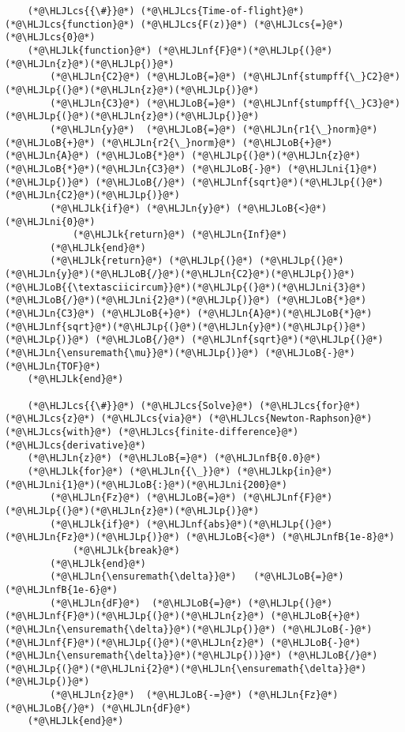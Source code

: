 \documentclass[12pt,a4paper]{article}
\newcommand{\HLJLk}[1]{\textcolor[RGB]{148,91,176}{\textbf{#1}}}
\newcommand{\HLJLkp}[1]{\textcolor[RGB]{148,91,176}{\textbf{#1}}}
\newcommand{\HLJLn}[1]{#1}
\newcommand{\HLJLnf}[1]{\textcolor[RGB]{66,102,213}{#1}}
\newcommand{\HLJLnfB}[1]{\textcolor[RGB]{59,151,46}{#1}}
\newcommand{\HLJLni}[1]{\textcolor[RGB]{59,151,46}{#1}}
\newcommand{\HLJLoB}[1]{\textcolor[RGB]{102,102,102}{\textbf{#1}}}
\newcommand{\HLJLp}[1]{#1}
\newcommand{\HLJLcs}[1]{\textcolor[RGB]{153,153,119}{\textit{#1}}}
\begin{document}
\begin{lstlisting}
	(*@\HLJLcs{{\#}}@*) (*@\HLJLcs{Time‐of‐flight}@*) (*@\HLJLcs{function}@*) (*@\HLJLcs{F(z)}@*) (*@\HLJLcs{=}@*) (*@\HLJLcs{0}@*)
	(*@\HLJLk{function}@*) (*@\HLJLnf{F}@*)(*@\HLJLp{(}@*)(*@\HLJLn{z}@*)(*@\HLJLp{)}@*)
		(*@\HLJLn{C2}@*) (*@\HLJLoB{=}@*) (*@\HLJLnf{stumpff{\_}C2}@*)(*@\HLJLp{(}@*)(*@\HLJLn{z}@*)(*@\HLJLp{)}@*)
		(*@\HLJLn{C3}@*) (*@\HLJLoB{=}@*) (*@\HLJLnf{stumpff{\_}C3}@*)(*@\HLJLp{(}@*)(*@\HLJLn{z}@*)(*@\HLJLp{)}@*)
		(*@\HLJLn{y}@*)  (*@\HLJLoB{=}@*) (*@\HLJLn{r1{\_}norm}@*) (*@\HLJLoB{+}@*) (*@\HLJLn{r2{\_}norm}@*) (*@\HLJLoB{+}@*) (*@\HLJLn{A}@*) (*@\HLJLoB{*}@*) (*@\HLJLp{(}@*)(*@\HLJLn{z}@*)(*@\HLJLoB{*}@*)(*@\HLJLn{C3}@*) (*@\HLJLoB{-}@*) (*@\HLJLni{1}@*)(*@\HLJLp{)}@*) (*@\HLJLoB{/}@*) (*@\HLJLnf{sqrt}@*)(*@\HLJLp{(}@*)(*@\HLJLn{C2}@*)(*@\HLJLp{)}@*)
		(*@\HLJLk{if}@*) (*@\HLJLn{y}@*) (*@\HLJLoB{<}@*) (*@\HLJLni{0}@*)
			(*@\HLJLk{return}@*) (*@\HLJLn{Inf}@*)
		(*@\HLJLk{end}@*)
		(*@\HLJLk{return}@*) (*@\HLJLp{(}@*) (*@\HLJLp{(}@*)(*@\HLJLn{y}@*)(*@\HLJLoB{/}@*)(*@\HLJLn{C2}@*)(*@\HLJLp{)}@*)(*@\HLJLoB{{\textasciicircum}}@*)(*@\HLJLp{(}@*)(*@\HLJLni{3}@*)(*@\HLJLoB{/}@*)(*@\HLJLni{2}@*)(*@\HLJLp{)}@*) (*@\HLJLoB{*}@*) (*@\HLJLn{C3}@*) (*@\HLJLoB{+}@*) (*@\HLJLn{A}@*)(*@\HLJLoB{*}@*)(*@\HLJLnf{sqrt}@*)(*@\HLJLp{(}@*)(*@\HLJLn{y}@*)(*@\HLJLp{)}@*) (*@\HLJLp{)}@*) (*@\HLJLoB{/}@*) (*@\HLJLnf{sqrt}@*)(*@\HLJLp{(}@*)(*@\HLJLn{\ensuremath{\mu}}@*)(*@\HLJLp{)}@*) (*@\HLJLoB{-}@*) (*@\HLJLn{TOF}@*)
	(*@\HLJLk{end}@*)

	(*@\HLJLcs{{\#}}@*) (*@\HLJLcs{Solve}@*) (*@\HLJLcs{for}@*) (*@\HLJLcs{z}@*) (*@\HLJLcs{via}@*) (*@\HLJLcs{Newton‐Raphson}@*) (*@\HLJLcs{with}@*) (*@\HLJLcs{finite‐difference}@*) (*@\HLJLcs{derivative}@*)
	(*@\HLJLn{z}@*) (*@\HLJLoB{=}@*) (*@\HLJLnfB{0.0}@*)
	(*@\HLJLk{for}@*) (*@\HLJLn{{\_}}@*) (*@\HLJLkp{in}@*) (*@\HLJLni{1}@*)(*@\HLJLoB{:}@*)(*@\HLJLni{200}@*)
		(*@\HLJLn{Fz}@*) (*@\HLJLoB{=}@*) (*@\HLJLnf{F}@*)(*@\HLJLp{(}@*)(*@\HLJLn{z}@*)(*@\HLJLp{)}@*)
		(*@\HLJLk{if}@*) (*@\HLJLnf{abs}@*)(*@\HLJLp{(}@*)(*@\HLJLn{Fz}@*)(*@\HLJLp{)}@*) (*@\HLJLoB{<}@*) (*@\HLJLnfB{1e-8}@*)
			(*@\HLJLk{break}@*)
		(*@\HLJLk{end}@*)
		(*@\HLJLn{\ensuremath{\delta}}@*)   (*@\HLJLoB{=}@*) (*@\HLJLnfB{1e-6}@*)
		(*@\HLJLn{dF}@*)  (*@\HLJLoB{=}@*) (*@\HLJLp{(}@*)(*@\HLJLnf{F}@*)(*@\HLJLp{(}@*)(*@\HLJLn{z}@*) (*@\HLJLoB{+}@*) (*@\HLJLn{\ensuremath{\delta}}@*)(*@\HLJLp{)}@*) (*@\HLJLoB{-}@*) (*@\HLJLnf{F}@*)(*@\HLJLp{(}@*)(*@\HLJLn{z}@*) (*@\HLJLoB{-}@*) (*@\HLJLn{\ensuremath{\delta}}@*)(*@\HLJLp{))}@*) (*@\HLJLoB{/}@*) (*@\HLJLp{(}@*)(*@\HLJLni{2}@*)(*@\HLJLn{\ensuremath{\delta}}@*)(*@\HLJLp{)}@*)
		(*@\HLJLn{z}@*)  (*@\HLJLoB{-=}@*) (*@\HLJLn{Fz}@*) (*@\HLJLoB{/}@*) (*@\HLJLn{dF}@*)
	(*@\HLJLk{end}@*)


\end{lstlisting}
\end{document}
